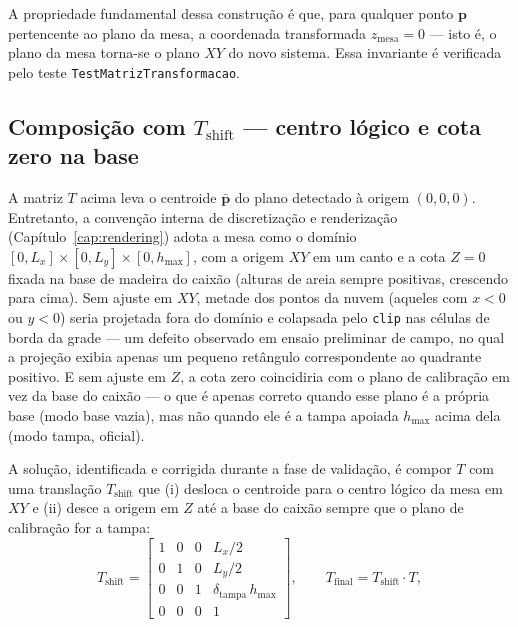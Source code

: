 \noindent A propriedade fundamental dessa construção é que, para
qualquer ponto $\mathbf{p}$ pertencente ao plano da mesa, a coordenada
transformada $z_{\text{mesa}} = 0$ — isto é, o plano da mesa torna-se o
plano $XY$ do novo sistema. Essa invariante é verificada pelo teste
\texttt{TestMatrizTransformacao}.

\subsection{Composição com $T_{\text{shift}}$ — centro lógico e cota zero na base}
\label{subsec:T-shift}

A matriz $T$ acima leva o centroide $\bar{\mathbf{p}}$ do plano
detectado à origem $(0, 0, 0)$. Entretanto, a convenção interna
de discretização e renderização (Capítulo~\ref{cap:rendering}) adota a
mesa como o domínio $[0, L_x] \times [0, L_y] \times [0, h_{\max}]$, com
a origem $XY$ em um canto e a cota $Z = 0$ fixada na base
de madeira do caixão (alturas de areia sempre positivas, crescendo
para cima). Sem ajuste em $XY$, metade dos pontos da nuvem (aqueles com
$x < 0$ ou $y < 0$) seria projetada fora do domínio e colapsada
pelo \texttt{clip} nas células de borda da grade — um defeito
observado em ensaio preliminar de campo, no qual a projeção exibia
apenas um pequeno retângulo correspondente ao quadrante positivo. E sem
ajuste em $Z$, a cota zero coincidiria com o plano de calibração
em vez da base do caixão — o que é apenas correto quando esse plano é a
própria base (modo base vazia), mas não quando ele é a tampa
apoiada $h_{\max}$ acima dela (modo tampa, oficial).

A solução, identificada e corrigida durante a fase de validação, é
compor $T$ com uma translação $T_{\text{shift}}$ que (i) desloca o
centroide para o centro lógico da mesa em $XY$ e (ii) desce a origem em
$Z$ até a base do caixão sempre que o plano de calibração for a tampa:
\begin{equation}
\label{eq:T-shift}
T_{\text{shift}} =
\begin{bmatrix}
1 & 0 & 0 & L_x / 2 \\
0 & 1 & 0 & L_y / 2 \\
0 & 0 & 1 & \delta_{\text{tampa}} \, h_{\max} \\
0 & 0 & 0 & 1
\end{bmatrix},
\qquad
T_{\text{final}} = T_{\text{shift}} \cdot T,
\end{equation}

